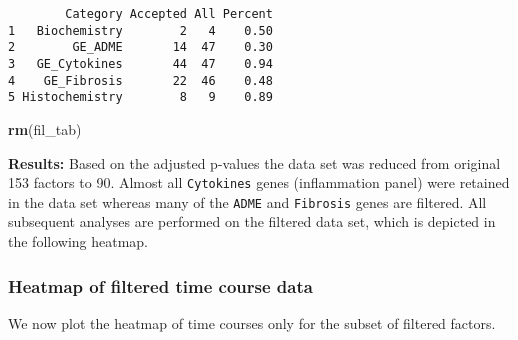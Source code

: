 \documentclass[]{article}
\newenvironment{Shaded}{\begin{snugshade}}{\end{snugshade}}
\newcommand{\KeywordTok}[1]{\textcolor[rgb]{0.13,0.29,0.53}{\textbf{{#1}}}}
\newcommand{\NormalTok}[1]{{#1}}
\begin{document}
\begin{verbatim}
        Category Accepted All Percent
1   Biochemistry        2   4    0.50
2        GE_ADME       14  47    0.30
3   GE_Cytokines       44  47    0.94
4    GE_Fibrosis       22  46    0.48
5 Histochemistry        8   9    0.89
\end{verbatim}

\begin{Shaded}
\begin{Highlighting}[]
\KeywordTok{rm}\NormalTok{(fil_tab)}
\end{Highlighting}
\end{Shaded}

\textbf{Results:} Based on the adjusted p-values the data set was
reduced from original 153 factors to 90. Almost all \texttt{Cytokines}
genes (inflammation panel) were retained in the data set whereas many of
the \texttt{ADME} and \texttt{Fibrosis} genes are filtered. All
subsequent analyses are performed on the filtered data set, which is
depicted in the following heatmap.

\subsubsection{Heatmap of filtered time course
data}\label{heatmap-of-filtered-time-course-data}

We now plot the heatmap of time courses only for the subset of filtered
factors.
\end{document}
